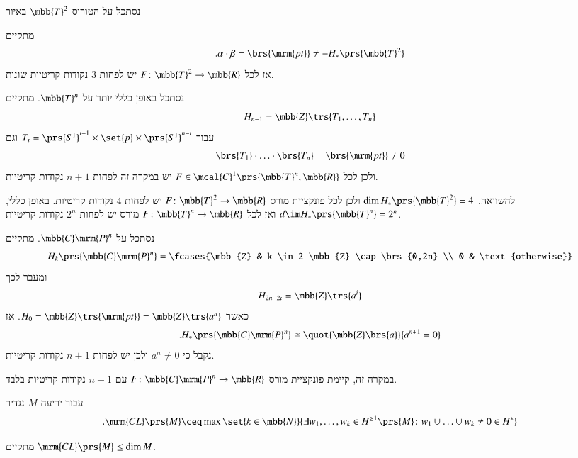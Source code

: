 \documentclass[a4paper,10pt,twoside,openany]{book}
\begin{document}
\begin{example}
נסתכל על הטורוס
$\mbb{T}^2$
באיור

מתקיים
\[\text{.} \alpha \cdot \beta = \brs{\mrm{pt}} \neq - H_*\prs{\mbb{T}^2}\]
אז לכל
$F \colon \mbb{T}^2 \to \mbb{R}$
יש לפחות
$3$
נקודות קריטיות שונות.

נסתכל באופן כללי יותר על
$\mbb{T}^n$.
מתקיים
\[H_{n-1} = \mbb{Z} \trs{T_1, \ldots, T_n}\]
עבור
$T_i = \prs{S^1}^{i-1} \times \set{p} \times \prs{S^1}^{n-i}$
וגם
\[\brs{T_1} \cdot \ldots \cdot \brs{T_n} = \brs{\mrm{pt}} \neq 0\]
ולכן
לכל
$F \in \mcal{C}^1 \prs{\mbb{T}^n,\mbb{R}}$
יש במקרה זה לפחות
$n+1$
נקודות קריטיות.

להשוואה,
$\dim H_*\prs{\mbb{T}^2} = 4$
ולכן לכל פונקציית מורס
$F \colon \mbb{T}^2 \to \mbb{R}$
יש לפחות
$4$
נקודות קריטיות.
באופן כללי,
$d\im H_*\prs{\mbb{T}^n} = 2^n$
ואז לכל
$F \colon \mbb{T}^n \to \mbb{R}$
מורס יש לפחות
$2^n$
נקודות קריטיות.
\end{example}

\begin{example}
נסתכל על
$\mbb{C}\mrm{P}^n$.
מתקיים
\begin{align*}
H_k\prs{\mbb{C}\mrm{P}^n} = \fcases{\mbb{Z} & k \in 2 \mbb{Z} \cap \brs{0,2n} \\ 0 & \text{otherwise}}
\end{align*}
ומעבר לכך
\begin{align*}
H_{2n - 2i} = \mbb{Z}\trs{a^i}
\end{align*}
כאשר
$H_0 = \mbb{Z}\trs{\mrm{pt}} = \mbb{Z}\trs{a^n}$.
אז
\begin{align*}
\text{.} H_*\prs{\mbb{C}\mrm{P}^n} \cong \quot{\mbb{Z}\brs{a}}{a^{n+1} = 0}
\end{align*}
נקבל כי
$a^n \neq 0$
ולכן יש לפחות
$n+1$
נקודות קריטיות.

במקרה זה, קיימת פונקציית מורס
$F \colon \mbb{C}\mrm{P}^n \to \mbb{R}$
עם
$n+1$
נקודות קריטיות בלבד.
\end{example}

\begin{definition}
עבור יריעה
$M$
נגדיר
\[\text{.} \mrm{CL}\prs{M} \ceq \max\set{k \in \mbb{N}}{\exists w_1, \ldots, w_k \in H^{\geq 1}\prs{M} \colon w_1 \cup \ldots \cup w_k \neq 0 \in H^*}\]
\end{definition}

\begin{remark}
מתקיים
$\mrm{CL}\prs{M} \leq \dim M$.
\end{remark}
\end{document}
